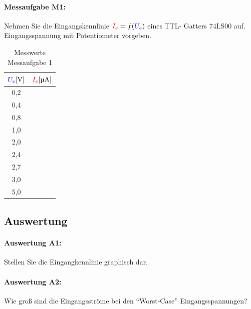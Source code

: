 \documentclass[11pt,a4paper,titlepage,parskip=half]{scrreprt}
\begin{document}
        \paragraph{Messaufgabe M1:} Nehmen Sie die Eingangskennlinie $\textcolor{red}{I_e} = f(\textcolor{blue}{U_e})$ eines TTL- Gatters 74LS00 auf. Eingangsspannung mit Potentiometer vorgeben.
            \begin{center}
                \begin{table}[H]
                    \caption{Messwerte Messaufgabe 1}
                    \renewcommand{\arraystretch}{1.6}
                    \begin{center}
                        \begin{tabular}{c|c}
                            $\textcolor{blue}{U_e} [\si{\volt}]$ & $\textcolor{red}{I_e} [\si{\micro\ampere}]$ \\ \hline
                            0,2 & \qquad\qquad\qquad\qquad\\\hline
                            0,4 & \\\hline
                            0,8 & \\\hline
                            1,0 & \\\hline
                            2,0 & \\\hline
                            2,4 & \\\hline
                            2,7 & \\\hline
                            3,0 & \\\hline
                            5,0 & \\
                        \end{tabular}
                    \end{center}
                \end{table}
            \end{center}


      \subsection{Auswertung}
        \paragraph{Auswertung A1:} Stellen Sie die Eingangkennlinie graphisch dar.


        \paragraph{Auswertung A2:} Wie groß sind die Eingangsströme bei den "`Worst-Case"' Eingangsspannungen?
\end{document}
